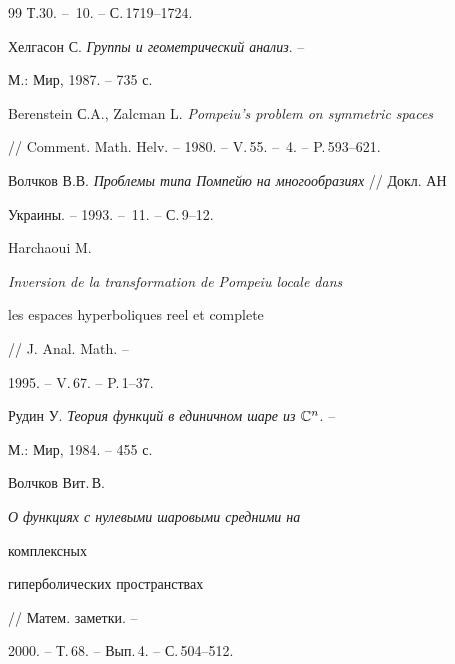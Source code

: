 \begin{thebibliography}{99}
Т.30. -- \No\,10. -- С.\,1719--1724. 




Хелгасон С. {\em Группы и геометрический анализ}. -- 


М.: Мир, 1987. -- 735 с. 




Berenstein С.A., Zalcman L. {\em Pompeiu's problem on symmetric spaces} 


// Comment. Math. Helv. -- 1980. -- V.\,55. -- \No\,4. -- P.\,593--621. 




Волчков В.В. {\em Проблемы типа Помпейю на многообразиях} // Докл. АН 


Украины. -- 1993. -- \No\,11. -- С.\,9--12. 




Harchaoui M. {\em Inversion de la transformation de Pompeiu locale dans 


les espaces hyperboliques reel et complete} // J. Anal. Math. -- 


1995. -- V.\,67. -- P.\,1--37. 




Рудин У. {\em Теория функций в единичном шаре из $\Bbb C^n$}. -- 


М.: Мир, 1984. -- 455 с. 




Волчков Вит.\,В. {\em О функциях с нулевыми шаровыми средними на 


комплексных 


гиперболических пространствах} // Матем. заметки. -- 


2000. -- Т.\,68. -- Вып.\,4. -- С.\,504--512. 


 


\end{thebibliography} 


 


\vskip 2cm 


 






 


\label{end} 


 











